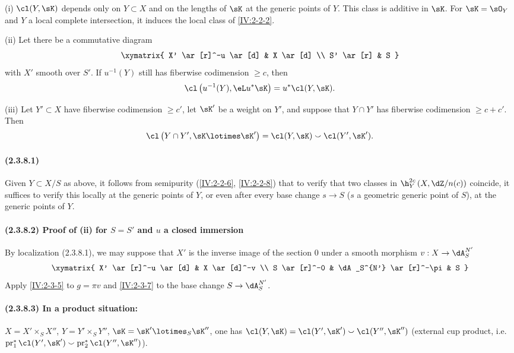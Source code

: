 \begin{theorem}\label{IV:2-3-8}
(i) $\cl(Y,\sK)$ depends only on $Y\subset X$ and on the lengths of $\sK$ at
the generic points of $Y$. This class is additive in $\sK$. For
$\sK=\sO_Y$ and $Y$ a local complete intersection, it induces the local
class of \ref{IV:2-2-2}.

(ii) Let there be a commutative diagram
\[\xymatrix{
  X' \ar[r]^-u \ar[d]
    & X \ar[d] \\
  S' \ar[r]
    & S
}\]
with $X'$ smooth over $S'$. If $u^{-1}(Y)$ still has fiberwise codimension
$\geqslant c$, then
\[
  \cl\left(u^{-1}(Y),\eL u^\ast\sK\right) = u^\ast \cl(Y,\sK) \text{.}
\]

(iii) Let $Y'\subset X$ have fiberwise codimension $\geqslant c'$, let
$\sK'$ be a weight on $Y'$, and suppose that $Y\cap Y'$ has fiberwise
codimension $\geqslant c+c'$. Then
\[
\cl\left(Y\cap Y',\sK\lotimes \sK'\right) = \cl(Y,\sK) \smallsmile \cl(Y',\sK') \text{.}
\]
\end{theorem}




\paragraph{(2.3.8.1)}\label{IV:2-3-8-1}
Given $Y\subset X/S$ as above, it follows from semipurity
(\ref{IV:2-2-6}, \ref{IV:2-2-8}) that to verify that two classes in
$\h_Y^{2 c}\left(X,\dZ/n(c)\right)$ coincide, it suffices to verify this
locally at the generic points of $Y$, or even after every base change
$s\to S$ ($s$ a geometric generic point of $S$), at the generic points of
$Y$.

\paragraph{(2.3.8.2) Proof of (ii) for $S=S'$ and $u$ a closed immersion}
By localization (2.3.8.1), we may suppose that $X'$ is the inverse image of the
section $0$ under a smooth morphism $v:X\to \dA_S^{N'}$
\[\xymatrix{
  X' \ar[r]^-u \ar[d]
    & X \ar[d]^-v \\
  S \ar[r]^-0
    & \dA_S^{N'} \ar[r]^-\pi
    & S
}\]
Apply \ref{IV:2-3-5} to $g=\pi v$ and \ref{IV:2-3-7} to the base change
$S\to \dA_S^{N'}$.

\paragraph{(2.3.8.3) In a product situation:}
$X=X'\times_S X''$, $Y=Y'\times_S Y''$, $\sK=\sK'\lotimes_S \sK''$, one has
$\cl(Y,\sK) = \cl(Y',\sK')\smallsmile \cl(Y'',\sK'')$ (external cup product,
i.e. $\operatorname{pr}_1^\ast \cl(Y',\sK')\smallsmile \operatorname{pr}_2^\ast \cl(Y'',\sK'')$).

